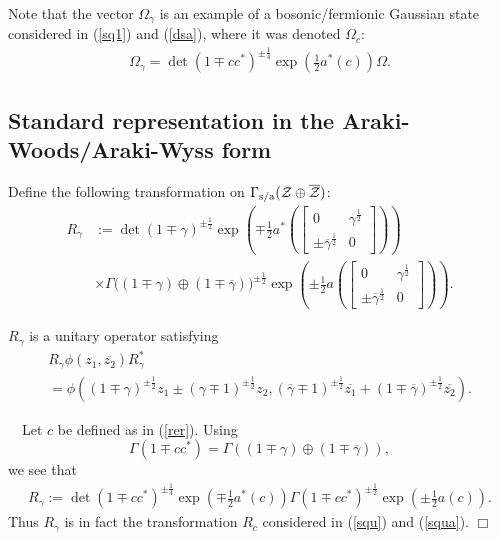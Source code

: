 \documentclass{svmult}
\newcommand{\beq}{\begin{equation}}
\newcommand{\eeq}{\end{equation}}
\def\bet{\begin{theorem}}
\def\eet{\end{theorem}}
\def\bar{\overline}
\def\sa{{\rm s/a}}
\def\12{{\frac12}}
\def\proof{
\noindent{\bf Proof.}\ \ }
\def\cZ{{\cal Z}}
\def\qed{$\Box$\medskip}
\def\12{\frac{1}{2}}
\def\12{\frac{1}{2}}
\begin{document}
Note that the vector $\Omega_\gamma$ is an example of a bosonic/fermionic
 Gaussian state 
considered in (\ref{sq1}) and (\ref{dsa}), where it was denoted $\Omega_c$:
\[\begin{array}{l}
\Omega_\gamma=
\det(1\mp cc^*)^{\pm\frac{1}{4}}\exp(\12 a^*(c)
)\Omega.
\end{array}\]


\subsection{Standard representation in the
Araki-Woods/Araki-Wyss
 form}
\label{a2.3}

Define the following transformation on $\Gamma_\sa(\cZ\oplus\bar\cZ)$:
\beq\begin{array}{rl}
R_\gamma &:=\det(1\mp\gamma)^{\pm\12}
\exp\left(\mp\12 a^*\left(\left[\begin{array}{cc}0&\gamma^\12\\
\pm\bar\gamma^\12&0\end{array}\right]\right)\right)\\[4mm]&\times
\Gamma\bigl((1\mp\gamma)\oplus(1\mp\bar\gamma)\bigr)^{\pm\12}
\exp\left(\pm\12 a\left(\left[\begin{array}{cc}0&\gamma^\12\\
\pm\bar\gamma^\12&0\end{array}\right]\right)\right)
.\end{array}\label{rrr}\eeq


\bet
 $R_\gamma $ is a unitary operator satisfying
\begin{equation}\begin{array}{l}
R_\gamma \phi(z_1,\bar{z_2})R_\gamma^*\\[3mm]
=\phi((1\mp\gamma)^{\pm\12}z_1\pm(\gamma\mp1)^{\pm\12} z_2,
(\bar\gamma\mp1)^{\pm\12} \bar{z_1}+
(1\mp\bar\gamma)^{\pm\12}\bar{z_2}).\end{array}\label{qq5}\end{equation}
\eet

\proof Let $c$ be defined as in (\ref{rer}).
Using \[\Gamma(1\mp cc^*)=
\Gamma((1\mp\gamma)\oplus(1\mp\bar\gamma)),\]
we see that \[\begin{array}{l}
R_\gamma:=\det(1\mp cc^*)^{\pm\frac{1}{4}}\exp(\mp\12  a^*(c))
\Gamma(1\mp cc^*)^{\pm\12}
\exp(\pm\12 a(c)).\end{array}
\]Thus $R_\gamma$ is in fact the transformation $R_c$ considered in 
(\ref{squ}) and (\ref{squa}).
\qed
\end{document}
